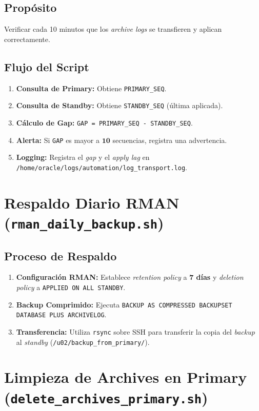 \documentclass[11pt, a4paper]{report}
\begin{document}
\subsection{Propósito}
Verificar cada 10 minutos que los \textit{archive logs} se transfieren y aplican correctamente.
\subsection{Flujo del Script}
\begin{enumerate}
    \item \textbf{Consulta de Primary:} Obtiene \texttt{PRIMARY\_SEQ}.
    \item \textbf{Consulta de Standby:} Obtiene \texttt{STANDBY\_SEQ} (última aplicada).
\item \textbf{Cálculo de Gap:} \texttt{GAP = PRIMARY\_SEQ - STANDBY\_SEQ}.
    \item \textbf{Alerta:} Si \texttt{GAP} es mayor a $\mathbf{10}$ secuencias, registra una advertencia.
\item \textbf{Logging:} Registra el \textit{gap} y el \textit{apply lag} en \texttt{/home/oracle/logs/automation/log\_transport.log}.
\end{enumerate}

\section{Respaldo Diario RMAN (\texttt{rman\_daily\_backup.sh})}

\subsection{Proceso de Respaldo}
\begin{enumerate}
    \item \textbf{Configuración RMAN:} Establece \textit{retention policy} a \textbf{7 días} y \textit{deletion policy} a \texttt{APPLIED ON ALL STANDBY}.
\item \textbf{Backup Comprimido:} Ejecuta \texttt{BACKUP AS COMPRESSED BACKUPSET DATABASE PLUS ARCHIVELOG}.
\item \textbf{Transferencia:} Utiliza \texttt{rsync} sobre SSH para transferir la copia del \textit{backup} al \textit{standby} (\texttt{/u02/backup\_from\_primary/}).
\end{enumerate}

\section{Limpieza de Archives en Primary (\texttt{delete\_archives\_primary.sh})}
\end{document}
